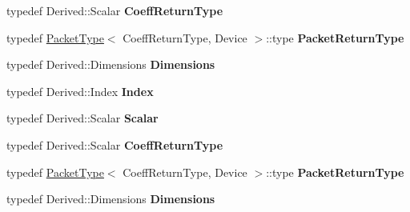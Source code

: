 \begin{DoxyCompactItemize}
typedef Derived\+::\+Scalar {\bfseries Coeff\+Return\+Type}
\item 
\mbox{\label{struct_eigen_1_1_tensor_evaluator_3_01const_01_derived_00_01_device_01_4_a8f92e1ac41461cf3da346f6925c803d1}} 
typedef \hyperlink{struct_eigen_1_1_packet_type}{Packet\+Type}$<$ Coeff\+Return\+Type, Device $>$\+::type {\bfseries Packet\+Return\+Type}
\item 
\mbox{\label{struct_eigen_1_1_tensor_evaluator_3_01const_01_derived_00_01_device_01_4_a8d061bfadff643a1a5fb7b2f27f429e9}} 
typedef Derived\+::\+Dimensions {\bfseries Dimensions}
\item 
\mbox{\label{struct_eigen_1_1_tensor_evaluator_3_01const_01_derived_00_01_device_01_4_a9ef465fa713bc2ca62aa3f8cf5628b4c}} 
typedef Derived\+::\+Index {\bfseries Index}
\item 
\mbox{\label{struct_eigen_1_1_tensor_evaluator_3_01const_01_derived_00_01_device_01_4_a6066c628b5390c555921e11c7054224a}} 
typedef Derived\+::\+Scalar {\bfseries Scalar}
\item 
\mbox{\label{struct_eigen_1_1_tensor_evaluator_3_01const_01_derived_00_01_device_01_4_ac770be11dea33164f023b4d93ad48f1b}} 
typedef Derived\+::\+Scalar {\bfseries Coeff\+Return\+Type}
\item 
\mbox{\label{struct_eigen_1_1_tensor_evaluator_3_01const_01_derived_00_01_device_01_4_a8f92e1ac41461cf3da346f6925c803d1}} 
typedef \hyperlink{struct_eigen_1_1_packet_type}{Packet\+Type}$<$ Coeff\+Return\+Type, Device $>$\+::type {\bfseries Packet\+Return\+Type}
\item 
\mbox{\label{struct_eigen_1_1_tensor_evaluator_3_01const_01_derived_00_01_device_01_4_a8d061bfadff643a1a5fb7b2f27f429e9}} 
typedef Derived\+::\+Dimensions {\bfseries Dimensions}
\end{DoxyCompactItemize}

